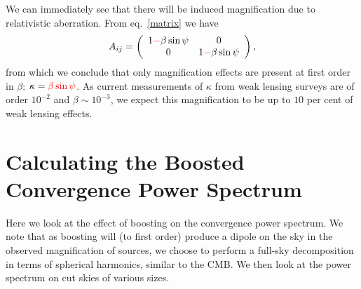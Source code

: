 \documentclass[useAMS,fleqn,usenatbib]{mn2e}
\begin{document}
We can immediately see  that there will be induced magnification due
to relativistic aberration. From eq.~\ref{matrix} we have
\begin{equation}
A_{ij} = \left(\begin{array}{cc}
1{\color{red}-}\beta\sin\psi & 0\\
0 & 1{\color{red}-}\beta\sin\psi
\end{array}\right),
\end{equation}
from which we conclude that only magnification effects are present
at first order in $\beta$: $\kappa = {\color{red}\beta\sin\psi}$. As current measurements of
$\kappa$ from weak lensing surveys are of order $10^{-2}$ and $\beta\sim10^{-3}$,
we expect this magnification to be up to $10$ per cent of weak lensing effects.


\section{Calculating the Boosted Convergence Power Spectrum}
\label{powerspectrum}
Here we look at the effect of boosting on the convergence power spectrum.
We note that as boosting will (to first order) produce a dipole on
the sky in the observed magnification of sources, we choose to perform
a full-sky decomposition in terms of spherical harmonics, similar
to the CMB. We then look at the power spectrum on cut skies of various
sizes.
\end{document}
